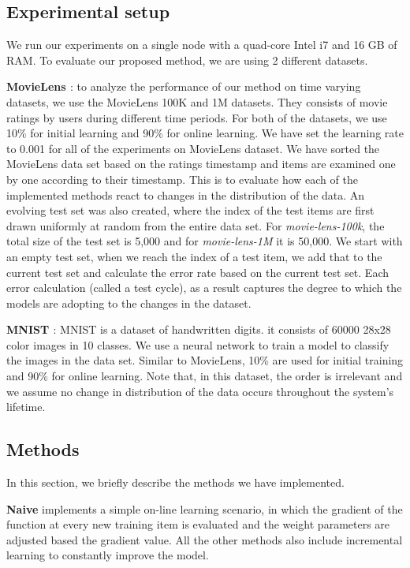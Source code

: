 \documentclass{sig-alternate-05-2015}
\begin{document}
\subsection{Experimental setup}
We run our experiments on a single node with a quad-core Intel i7 and 16 GB of RAM. 
To evaluate our proposed method, we are using 2 different datasets.

\textbf{MovieLens \cite{harper2016movielens}}: to analyze the performance of our method on time varying datasets, we use the MovieLens 100K and 1M datasets. 
They consists of movie ratings by users during different time periods. 
For both of the datasets, we use 10\% for initial learning and 90\% for online learning. 
We have set the learning rate to 0.001 for all of the experiments on MovieLens dataset.
We have sorted the MovieLens data set based on the ratings timestamp and items are examined one by one according to their timestamp.
This is to evaluate how each of the implemented methods react to changes in the distribution of the data.
An evolving test set was also created, where the index of the test items are first drawn uniformly at random from the entire data set.
For \textit{movie-lens-100k}, the total size of the test set is 5,000 and for \textit{movie-lens-1M} it is 50,000.
We start with an empty test set, when we reach the index of a test item, we add that to the current test set and calculate the error rate based on the current test set.
Each error calculation (called a test cycle), as a result captures the degree to which the models are adopting to the changes in the dataset.

\textbf{MNIST \cite{lecun-mnist}}: MNIST is a dataset of handwritten digits.
it consists of 60000 28x28 color images in 10 classes. We use a neural network to train a model to classify the images in the data set. 
Similar to MovieLens, 10\% are used for initial training and 90\% for online learning. 
Note that, in this dataset, the order is irrelevant and we assume no change in distribution of the data occurs throughout the system's lifetime. 

\subsection{Methods}
In this section, we briefly describe the methods we have implemented.

\textbf{Naive} implements a simple on-line learning scenario, in which the gradient of the function at every new training item is evaluated and the weight parameters are adjusted based the gradient value. 
All the other methods also include incremental learning to constantly improve the model.
\end{document}

